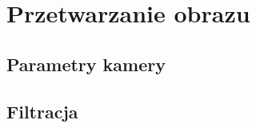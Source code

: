 \chapter{Przetwarzanie obrazu}
\label{cha:przetwarzanieObrazu}

\section{Parametry kamery}
\label{sec:parametryKamery}

\section{Filtracja}
\label{sec:filtracja}